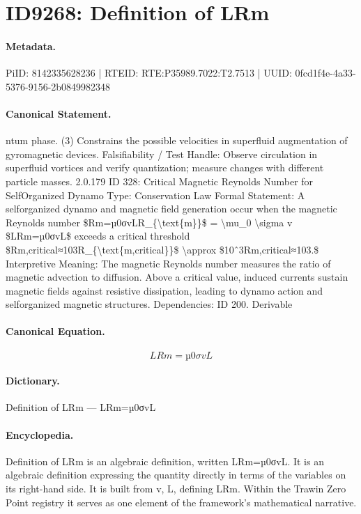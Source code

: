 \section*{ID9268: Definition of LRm}
\paragraph{Metadata.}
PiID: 8142335628236 | RTEID: RTE:P35989.7022:T2.7513 | UUID: 0fcd1f4e-4a33-5376-9156-2b0849982348

\paragraph{Canonical Statement.}
ntum phase. (3) Constrains the possible velocities in superfluid augmentation of gyromagnetic devices. Falsifiability / Test Handle: Observe circulation in superfluid vortices and verify quantization; measure changes with different particle masses. 2.0.179 ID 328: Critical Magnetic Reynolds Number for SelfOrganized Dynamo Type: Conservation Law Formal Statement: A selforganized dynamo and magnetic field generation occur when the magnetic Reynolds number \$Rm=µ0σvLR\_\{\textbackslash{}text\{m\}\}\$ = \textbackslash{}mu\_0 \textbackslash{}sigma v \$LRm=µ0σvL\$ exceeds a critical threshold \$Rm,critical≈103R\_\{\textbackslash{}text\{m,critical\}\}\$ \textbackslash{}approx \$10ˆ3Rm,critical≈103.\$ Interpretive Meaning: The magnetic Reynolds number measures the ratio of magnetic advection to diffusion. Above a critical value, induced currents sustain magnetic fields against resistive dissipation, leading to dynamo action and selforganized magnetic structures. Dependencies: ID 200. Derivable

\paragraph{Canonical Equation.}
\[
LRm=µ0σvL
\]

\paragraph{Dictionary.}
Definition of LRm — LRm=µ0σvL

\paragraph{Encyclopedia.}
Definition of LRm is an algebraic definition, written LRm=µ0σvL. It is an algebraic definition expressing the quantity directly in terms of the variables on its right-hand side. It is built from v, L, defining LRm. Within the Trawin Zero Point registry it serves as one element of the framework's mathematical narrative.
